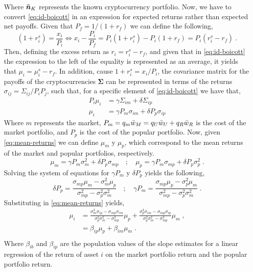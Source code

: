 \documentclass{article}
\begin{document}
Where $\bm{\Bar{n}}_K$ represents the known cryptocurrency portfolio. Now, we have to convert \eqref{eq:id-boicott} in an expression for expected returns rather than expected net payoffs. Given that $P_f=1/(1+r_f)$ we can define the following,
\begin{equation*}
	(1+r^{s}_{i}) = \frac{x_i}{P_i} \Leftrightarrow x_i - \frac{P_i}{P_f}=P_i(1+r^{s}_{i}) - P_i(1+r_f)=P_i(r^{s}_{i}-r_f)\;.
\end{equation*}
Then, defining the excess return as $r_i=r^{s}_{i}-r_{f}$, and given that in \eqref{eq:id-boicott} the expression to the left of the equality is represented as an average, it yields that $\mu_{i}=\mu^{s}_{i}-r_{f}$. In addition, cause $1+r^{s}_{i}=x_i/P_i$, the covariance matrix for the payoffs of the cryptocurrencies $\bm{\Sigma}$ can be represented in terms of the returns $\sigma_{ij}=\Sigma_{ij}/P_{i}P_{j}$, such that, for a specific element of \eqref{eq:id-boicott} we have that,
\begin{equation}
	\begin{split}
		P_i \mu_i&=\gamma \Sigma_{im} + \delta\Sigma_{ip}\\
		\mu_{i} &= \gamma P_m \sigma_{im} + \delta P_p \sigma_{ip}
	\end{split}
	\label{eq:mean-returns}
\end{equation}
Where $m$ represents the market, $P_m =q_m \Bar{w}_{M}=q_U \Bar{w}_{U} + q_R \Bar{w}_{R} $ is the cost of the market portfolio, and $P_p$ is the cost of the popular portfolio. Now, given \eqref{eq:mean-returns} we can define $\mu_{m}$ y $\mu_{p}$, which correspond to the mean returns of the market and popular portfolios, respectively.
\begin{equation*}
	\mu_{m} = \gamma P_m \sigma^{2}_{m} + \delta P_p \sigma_{mp} \quad; \quad \mu_{p} = \gamma P_m \sigma_{mp} + \delta P_p \sigma^{2}_{p}\;.
\end{equation*}
Solving the system of equations for $\gamma P_m$ y $\delta P_p$ yields the following,
\begin{equation*}
	\delta P_p = \frac{\sigma_{mp}\mu_{m}-\sigma^{2}_{m}\mu_{p}}{\sigma^{2}_{mp}-\sigma^{2}_{p}\sigma^{2}_{m}}\quad ; \quad \gamma P_m = \frac{\sigma_{mp}\mu_{p}-\sigma^{2}_{p}\mu_{m}}{\sigma^{2}_{mp}-\sigma^{2}_{p}\sigma^{2}_{m}}\;.
\end{equation*}
Substituting in \eqref{eq:mean-returns} yields,
\begin{equation}
	\begin{split}
		\mu_{i} &= \frac{\sigma^{2}_{m}\sigma_{ip}-\sigma_{mp}\sigma_{im}}{\sigma^{2}_{p}\sigma^{2}_{m}-\sigma^{2}_{mp}}\mu_{p} + \frac{\sigma^{2}_{p}\sigma_{im}-\sigma_{mp}\sigma_{ip}}{\sigma^{2}_{p}\sigma^{2}_{m}-\sigma^{2}_{mp}}\mu_{m}\;,\\
		&= \beta_{ip}\mu_{p} + \beta_{im}\mu_{m}\;.\\  
	\end{split}
\end{equation}
Where $\beta_{ib}$ and $\beta_{ip}$ are the population values of the slope estimates for a linear regression of the return of asset $i$ on the market portfolio return and the popular portfolio return.
\end{document}
